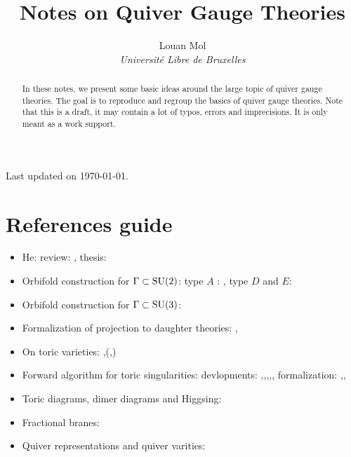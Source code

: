 \documentclass[a4paper,10pt]{article}
\title{\textbf{Notes on Quiver Gauge Theories}}
\author{Louan Mol\\ \textit{Université Libre de Bruxelles}}
\date{}
\begin{document}
\begin{titlepage}
    
    \maketitle

    \thispagestyle{empty}

    \vspace{2cm}

    \begin{abstract}
        In these notes, we present some basic ideas around the large topic of quiver gauge theories.  The goal is to reproduce and regroup the basics of quiver gauge theories. Note that this is a draft, it may contain a lot of typos, errors and imprecisions. It is only meant as a work support.
    \end{abstract}

    \vfill

    \hfill Last updated on \today.
    
\end{titlepage}
  
\pagebreak

\tableofcontents

\pagebreak

\nocite{*}



\pagebreak
\appendix



\section{References guide}

\begin{itemize}
    \item He: review: \cite{he2004lectures}, thesis: \cite{masterHe}
    \item Orbifold construction for $\Gamma\subset\text{SU}(2)$: type $A$ : \cite{douglas1996dbranes}, type $D$ and $E$: \cite{PhysRevD.55.6382}
    \item Orbifold construction for $\Gamma\subset\text{SU}(3)$:\cite{Hanany_1999}
    \item Formalization of projection to daughter theories: \cite{vafa1998},\cite{silervstein1998}
    \item On toric varieties: \cite{cox2011toric},\cite{torigeomandCY}(\cite{fulton1993introduction},\cite{oda1988convex})
    \item Forward algorithm  for toric singularities: devlopments: \cite{FA1},\cite{FA2},\cite{FA3},\cite{FA4},\cite{FA5}, formalization: \cite{FA6},\cite{FA7},\cite{FA8}
    \item Toric diagrams, dimer diagrams and Higgsing: \cite{Argurio_20081}
    \item Fractional branes: \cite{Argurio_20082}
    \item Quiver representations and quiver varities: \cite{kirillov2016quiver}
\end{itemize}
\end{document}
